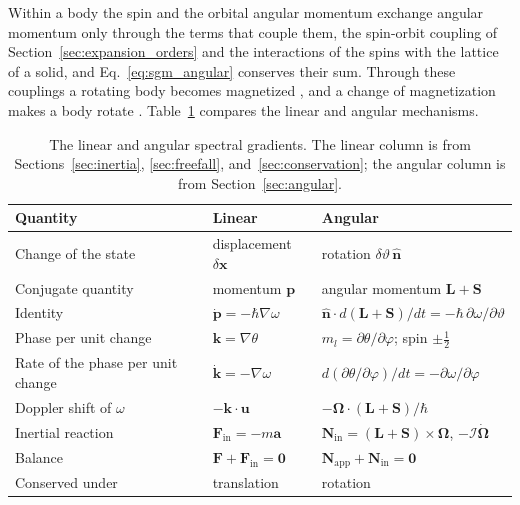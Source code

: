 \documentclass[aps,prd,onecolumn,tightenlines,nofootinbib,notitlepage,11pt,floatfix]{revtex4-2}
\theoremstyle{indentedtheorem}
\begin{document}
Within a body the spin and the orbital angular momentum exchange angular momentum only through the terms that couple them, the spin-orbit coupling of Section~\ref{sec:expansion_orders} and the interactions of the spins with the lattice of a solid, and Eq.~\eqref{eq:sgm_angular} conserves their sum. Through these couplings a rotating body becomes magnetized \citep{Barnett1915}, and a change of magnetization makes a body rotate \citep{EinsteinDeHaas1915Experimental}. Table~\ref{tab:linear_angular} compares the linear and angular mechanisms.

\begin{table}[tbp]
\centering
\caption{The linear and angular spectral gradients. The linear column is from Sections~\ref{sec:inertia}, \ref{sec:freefall}, and~\ref{sec:conservation}; the angular column is from Section~\ref{sec:angular}.}
\label{tab:linear_angular}
\begin{tabular}{lll}
\toprule
\textbf{Quantity} & \textbf{Linear} & \textbf{Angular} \\
\midrule
Change of the state & displacement $\delta\mathbf{x}$ & rotation $\delta\vartheta\,\hat{\mathbf{n}}$ \\
Conjugate quantity & momentum $\mathbf{p}$ & angular momentum $\mathbf{L}+\mathbf{S}$ \\
Identity & $\dot{\mathbf{p}}=-\hbar\nabla\omega$ & $\hat{\mathbf{n}}\cdot d(\mathbf{L}+\mathbf{S})/dt=-\hbar\,\partial\omega/\partial\vartheta$ \\
Phase per unit change & $\mathbf{k}=\nabla\theta$ & $m_l=\partial\theta/\partial\varphi$; spin $\pm\tfrac{1}{2}$ \\
Rate of the phase per unit change & $\dot{\mathbf{k}}=-\nabla\omega$ & $d(\partial\theta/\partial\varphi)/dt=-\partial\omega/\partial\varphi$ \\
Doppler shift of $\omega$ & $-\mathbf{k}\cdot\mathbf{u}$ & $-\boldsymbol{\Omega}\cdot(\mathbf{L}+\mathbf{S})/\hbar$ \\
Inertial reaction & $\mathbf{F}_\text{in}=-m\mathbf{a}$ & $\mathbf{N}_\text{in}=(\mathbf{L}+\mathbf{S})\times\boldsymbol{\Omega}$, $-\mathcal{I}\dot{\boldsymbol{\Omega}}$ \\
Balance & $\mathbf{F}+\mathbf{F}_\text{in}=\mathbf{0}$ & $\mathbf{N}_\text{app}+\mathbf{N}_\text{in}=\mathbf{0}$ \\
Conserved under & translation & rotation \\
\bottomrule
\end{tabular}
\end{table}
\end{document}
